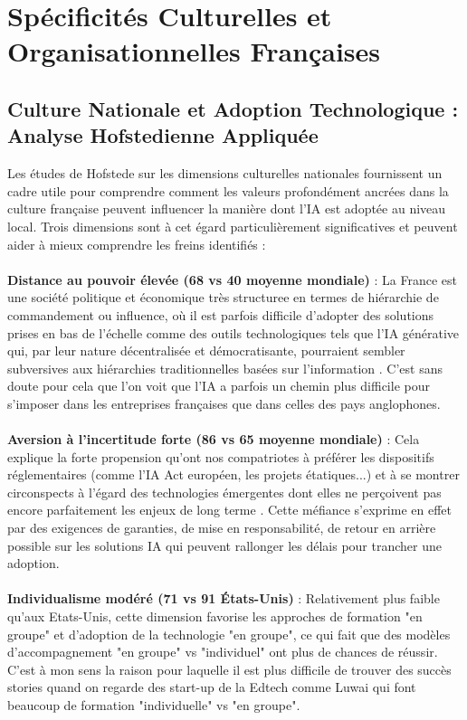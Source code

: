 \section{Spécificités Culturelles et Organisationnelles Françaises}

\subsection{Culture Nationale et Adoption Technologique : Analyse Hofstedienne Appliquée}

Les études de Hofstede sur les dimensions culturelles nationales \cite{hofstede2001culture} fournissent un cadre utile pour comprendre comment les valeurs profondément ancrées dans la culture française peuvent influencer la manière dont l'IA est adoptée au niveau local. Trois dimensions sont à cet égard particulièrement significatives et peuvent aider à mieux comprendre les freins identifiés :
\\\\
\textbf{Distance au pouvoir élevée (68 vs 40 moyenne mondiale)} : La France est une société politique et économique très structuree en termes de hiérarchie de commandement ou influence, où il est parfois difficile d'adopter des solutions prises en bas de l'échelle comme des outils technologiques tels que l'IA générative qui, par leur nature décentralisée et démocratisante, pourraient sembler subversives aux hiérarchies traditionnelles basées sur l'information \cite{meyer2014culture}. C'est sans doute pour cela que l'on voit que l'IA a parfois un chemin plus difficile pour s'imposer dans les entreprises françaises que dans celles des pays anglophones.
\\\\
\textbf{Aversion à l'incertitude forte (86 vs 65 moyenne mondiale)} : Cela explique la forte propension qu'ont nos compatriotes à préférer les dispositifs réglementaires (comme l'IA Act européen, les projets étatiques...) et à se montrer circonspects à l'égard des technologies émergentes dont elles ne perçoivent pas encore parfaitement les enjeux de long terme \cite{bertolucci2024artificial}. Cette méfiance s'exprime en effet par des exigences de garanties, de mise en responsabilité, de retour en arrière possible sur les solutions IA qui peuvent rallonger les délais pour trancher une adoption.
\\\\
\textbf{Individualisme modéré (71 vs 91 États-Unis)} : Relativement plus faible qu'aux Etats-Unis, cette dimension favorise les approches de formation "en groupe" et d'adoption de la technologie "en groupe", ce qui fait que des modèles d'accompagnement "en groupe" vs "individuel" ont plus de chances de réussir. C'est à mon sens la raison pour laquelle il est plus difficile de trouver des succès stories quand on regarde des start-up de la Edtech comme Luwai qui font beaucoup de formation "individuelle" vs "en groupe". 
